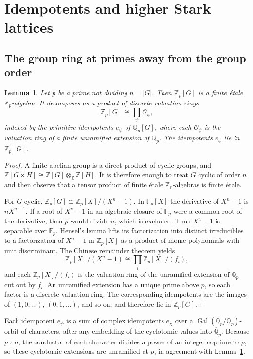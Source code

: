 \documentclass[11pt]{article}
\theoremstyle{plain}
\newtheorem{lemma}[theorem]{Lemma}
\theoremstyle{definition}
\theoremstyle{remark}
\newcommand{\Z}{\mathbb{Z}}
\newcommand{\Q}{\mathbb{Q}}
\newcommand{\F}{\mathbb{F}}
\newcommand{\OK}{\mathcal{O}}
\newcommand{\Gal}{\operatorname{Gal}}
\begin{document}
\section{Idempotents and higher Stark lattices}
\label{sec:thmB}

\subsection{The group ring at primes away from the group order}

\begin{lemma}
\label{lem:etale}
Let $p$ be a prime not dividing $n=|G|$.
Then $\Z_p[G]$ is a finite \'etale $\Z_p$-algebra.
It decomposes as a product of discrete valuation rings
\[
  \Z_p[G]\cong\prod_{\psi}\OK_{\psi},
\]
indexed by the primitive idempotents $e_{\psi}$ of $\Q_p[G]$, where each $\OK_{\psi}$ is the valuation ring of a finite unramified extension of $\Q_p$.
The idempotents $e_{\psi}$ lie in $\Z_p[G]$.
\end{lemma}

\begin{proof}
A finite abelian group is a direct product of cyclic groups, and $\Z[G\times H]\cong\Z[G]\otimes_{\Z}\Z[H]$.
It is therefore enough to treat $G$ cyclic of order $n$ and then observe that a tensor product of finite \'etale $\Z_p$-algebras is finite \'etale.

For $G$ cyclic, $\Z_p[G]\cong\Z_p[X]/(X^{n}-1)$.
In $\F_p[X]$ the derivative of $X^{n}-1$ is $nX^{n-1}$.
If a root of $X^{n}-1$ in an algebraic closure of $\F_p$ were a common root of the derivative, then $p$ would divide $n$, which is excluded.
Thus $X^{n}-1$ is separable over $\F_p$.
Hensel's lemma lifts its factorization into distinct irreducibles to a factorization of $X^{n}-1$ in $\Z_p[X]$ as a product of monic polynomials with unit discriminant.
The Chinese remainder theorem yields
\[
  \Z_p[X]/(X^{n}-1)\cong\prod_{i}\Z_p[X]/(f_i),
\]
and each $\Z_p[X]/(f_i)$ is the valuation ring of the unramified extension of $\Q_p$ cut out by $f_i$.
An unramified extension has a unique prime above $p$, so each factor is a discrete valuation ring.
The corresponding idempotents are the images of $(1,0,\ldots)$, $(0,1,\ldots)$, and so on, and therefore lie in $\Z_p[G]$.
\end{proof}

Each idempotent $e_{\psi}$ is a sum of complex idempotents $e_{\chi}$ over a $\Gal(\overline{\Q}_p/\Q_p)$-orbit of characters, after any embedding of the cyclotomic values into $\overline{\Q}_p$.
Because $p\nmid n$, the conductor of each character divides a power of an integer coprime to $p$, so these cyclotomic extensions are unramified at $p$, in agreement with Lemma~\ref{lem:etale}.
\end{document}
